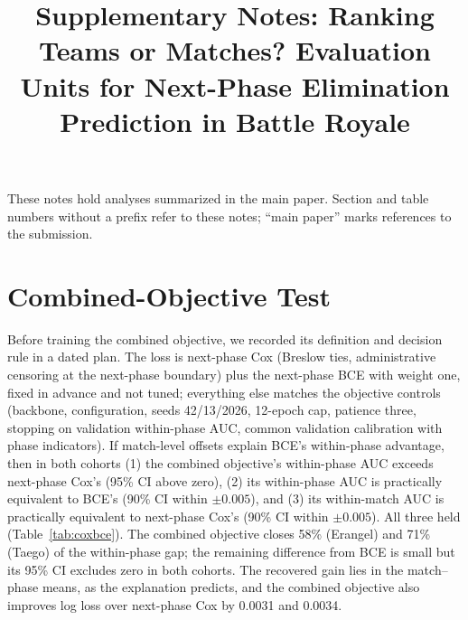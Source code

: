 \documentclass[sigconf,anonymous,nonacm]{acmart}
\begin{document}
\title[Supplementary Notes]{Supplementary Notes: Ranking Teams or Matches? Evaluation Units for Next-Phase Elimination Prediction in Battle Royale}
\maketitle
These notes hold analyses summarized in the main paper. Section and table numbers without a prefix refer to these notes; ``main paper'' marks references to the submission.

\section{Combined-Objective Test}
Before training the combined objective, we recorded its definition and decision rule in a dated plan. The loss is next-phase Cox (Breslow ties, administrative censoring at the next-phase boundary) plus the next-phase BCE with weight one, fixed in advance and not tuned; everything else matches the objective controls (backbone, configuration, seeds 42/13/2026, 12-epoch cap, patience three, stopping on validation within-phase AUC, common validation calibration with phase indicators). If match-level offsets explain BCE's within-phase advantage, then in both cohorts (1) the combined objective's within-phase AUC exceeds next-phase Cox's (95\% CI above zero), (2) its within-phase AUC is practically equivalent to BCE's (90\% CI within $\pm0.005$), and (3) its within-match AUC is practically equivalent to next-phase Cox's (90\% CI within $\pm0.005$). All three held (Table~\ref{tab:coxbce}). The combined objective closes 58\% (Erangel) and 71\% (Taego) of the within-phase gap; the remaining difference from BCE is small but its 95\% CI excludes zero in both cohorts. The recovered gain lies in the match--phase means, as the explanation predicts, and the combined objective also improves log loss over next-phase Cox by 0.0031 and 0.0034.
\end{document}
